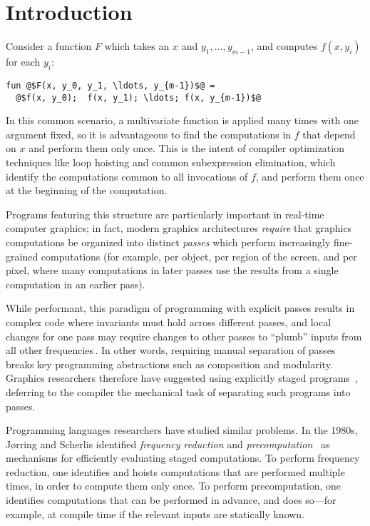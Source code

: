 \section{Introduction}

Consider a function $F$ which takes an $x$ and $y_1,\dots,y_{m-1}$, and computes
$f(x,y_i)$ for each $y_i$:
\begin{lstlisting}
fun @$F(x, y_0, y_1, \ldots, y_{m-1})$@ = 
  @$f(x, y_0);  f(x, y_1); \ldots; f(x, y_{m-1})$@
\end{lstlisting}
%
In this common scenario, a multivariate function is applied many times with one
argument fixed, so it is advantageous to find the computations in $f$ that
depend on $x$ and perform them only once. This is the intent of compiler
optimization techniques like loop hoisting and common subexpression elimination,
which identify the computations common to all invocations of $f$, and perform
them once at the beginning of the computation.

Programs featuring this structure are particularly important in real-time
computer graphics; in fact, modern graphics architectures \emph{require} that
graphics computations be organized into distinct {\em passes} which perform
increasingly fine-grained computations (for example, per object, per region of
the screen, and per pixel, where many computations in later passes use the
results from a single computation in an earlier pass).

While performant, this paradigm of programming with explicit passes results in
complex code where invariants must hold across different passes, and local
changes for one pass may require changes to other passes to ``plumb'' inputs
from all other frequencies\,\cite{Foley:2011}.
%
In other words, requiring manual separation of passes breaks key programming
abstractions such as composition and modularity.
%
Graphics researchers therefore have suggested using explicitly staged programs
\,\cite{Proudfoot:2001,Foley:2011,He:2014}, deferring to the compiler the
mechanical task of separating such programs into passes.

Programming languages researchers have studied similar problems. In the 1980s,
J{\o}rring and Scherlis identified {\em frequency reduction} and {\em
precomputation}~\cite{JS86-staging} as mechanisms for efficiently evaluating
staged computations. To perform frequency reduction, one identifies and hoists
computations that are performed multiple times, in order to compute them only
once. To perform precomputation, one identifies computations that can be
performed in advance, and does so---for example, at compile time if the relevant
inputs are statically known.

